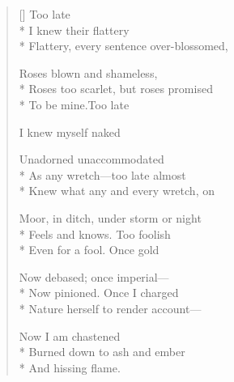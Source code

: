 \label{ch:lear_az}
\settowidth{\versewidth}{Flattery, every sentence over-blossomed,}
\begin{verse}[\versewidth]
\hspace*{3\vgap} Too late\\*
I knew their flattery\\*
Flattery, every sentence over-blossomed,

Roses blown and shameless,\\*
Roses too scarlet, but roses promised\\*
To be mine.\qquad Too late

I knew myself naked

Unadorned    unaccommodated\\*
As any wretch---too late almost\\*
Knew what any and every wretch, on

Moor, in ditch, under storm or night\\*
Feels and knows.   Too foolish\\*
Even for a fool.   Once gold

Now debased; once imperial---\\*
Now pinioned.   Once I charged\\*
Nature herself to render account---

Now I am chastened\\*
Burned down to ash and ember\\*
And hissing flame.
\end{verse}
